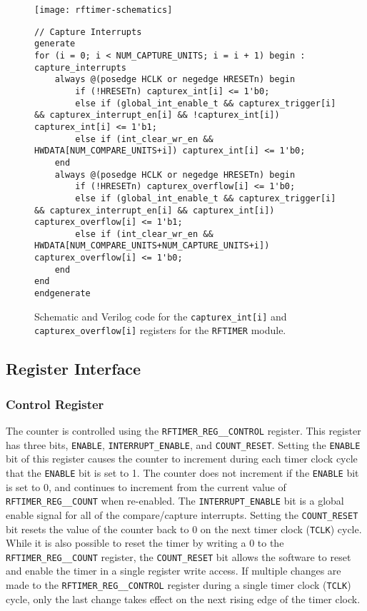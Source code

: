 \begin{figure}
	\centering
	\texttt{[image: rftimer-schematics]}
	\begin{lstlisting}
// Capture Interrupts
generate
for (i = 0; i < NUM_CAPTURE_UNITS; i = i + 1) begin : capture_interrupts
    always @(posedge HCLK or negedge HRESETn) begin
        if (!HRESETn) capturex_int[i] <= 1'b0;
        else if (global_int_enable_t && capturex_trigger[i] && capturex_interrupt_en[i] && !capturex_int[i]) capturex_int[i] <= 1'b1;
        else if (int_clear_wr_en && HWDATA[NUM_COMPARE_UNITS+i]) capturex_int[i] <= 1'b0;
    end
    always @(posedge HCLK or negedge HRESETn) begin
        if (!HRESETn) capturex_overflow[i] <= 1'b0;
        else if (global_int_enable_t && capturex_trigger[i] && capturex_interrupt_en[i] && capturex_int[i]) capturex_overflow[i] <= 1'b1;
        else if (int_clear_wr_en && HWDATA[NUM_COMPARE_UNITS+NUM_CAPTURE_UNITS+i]) capturex_overflow[i] <= 1'b0;
    end
end
endgenerate
	\end{lstlisting}
	\caption{Schematic and Verilog code for the \texttt{capturex\_int[i]} and \texttt{capturex\_overflow[i]} registers for the \texttt{RFTIMER} module.}
	\label{fig:capture-int}
\end{figure}

\subsection{Register Interface} \label{rftimer-registers}
\subsubsection{Control Register}
The counter is controlled using the \texttt{RFTIMER\_REG\_\_CONTROL} register. This register has three bits, \texttt{ENABLE}, \texttt{INTERRUPT\_ENABLE}, and \texttt{COUNT\_RESET}. Setting the \texttt{ENABLE} bit of this register causes the counter to increment during each timer clock cycle that the \texttt{ENABLE} bit is set to 1. The counter does not increment if the \texttt{ENABLE} bit is set to 0, and continues to increment from the current value of \texttt{RFTIMER\_REG\_\_COUNT} when re-enabled. The \texttt{INTERRUPT\_ENABLE} bit is a global enable signal for all of the compare/capture interrupts. Setting the \texttt{COUNT\_RESET} bit resets the value of the counter back to 0 on the next timer clock (\texttt{TCLK}) cycle. While it is also possible to reset the timer by writing a 0 to the \texttt{RFTIMER\_REG\_\_COUNT} register, the \texttt{COUNT\_RESET} bit allows the software to reset and enable the timer in a single register write access. If multiple changes are made to the \texttt{RFTIMER\_REG\_\_CONTROL} register during a single timer clock (\texttt{TCLK}) cycle, only the last change takes effect on the next rising edge of the timer clock.

